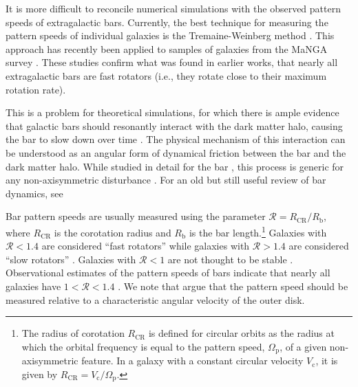 \documentclass[twocolumn,linenumbers]{aastex631}
\newcommand{\RCR}{\ensuremath{R_{\textrm{CR}}}}
\newcommand{\Rot}{\ensuremath{\mathcal{R}}}
\newcommand{\Vc}{\ensuremath{V_{\textrm{c}} }}
\newcommand{\PS}{\ensuremath{\Omega_{\textrm{p}}}}
\newcommand{\Rb}{\ensuremath{R_{\textrm{b}}}}
\begin{document}
It is more difficult to reconcile numerical simulations with the observed
pattern speeds of extragalactic bars. Currently, the best technique for
measuring the pattern speeds of individual galaxies is the Tremaine-Weinberg
method \citep{1984ApJ...282L...5T, 2011MSAIS..18...23C}. This approach has
recently been applied to samples of galaxies from the MaNGA survey
\citep{2019MNRAS.482.1733G, 2020MNRAS.491.3655G}. These studies confirm
what was found in earlier works, that nearly all extragalactic bars are fast
rotators (i.e., they rotate close to their maximum rotation rate).

This is a problem for theoretical simulations, for which there is ample evidence
that galactic bars should resonantly interact with the dark matter halo, causing
the bar to slow down over time \citep{1992ApJ...400...80H, 2000ApJ...543..704D,
2002MNRAS.330...35A, 2002ApJ...569L..83A, 2003MNRAS.341.1179A,
2003MNRAS.346..251O, 2005MNRAS.363..991H, 2006ApJ...637..214M,
2007MNRAS.375..460W, 2009ApJ...697..293D}. The physical mechanism of this
interaction can be understood as an angular form of dynamical friction between
the bar and the dark matter halo. While studied in detail for the bar
\citep{1984MNRAS.209..729T, 1985MNRAS.213..451W}, this process is generic for
any non-axisymmetric disturbance \citep{1972MNRAS.157....1L}. For an old but
still useful review of bar dynamics, see \citet{1993RPPh...56..173S}

Bar pattern speeds are usually measured using the parameter $\Rot=\RCR/\Rb$,
where \RCR{} is the corotation radius and \Rb{} is the bar length.\footnote{The
radius of corotation \RCR{} is defined for circular orbits as the radius at
which the orbital frequency is equal to the pattern speed, \PS{}, of a given
non-axisymmetric feature. In a galaxy with a constant circular velocity \Vc{},
it is given by $\RCR = \Vc / \PS$.} Galaxies with $\Rot < 1.4$ are considered
``fast rotators'' while galaxies with $\Rot > 1.4$ are considered ``slow
rotators'' \citep{2000ApJ...543..704D}. Galaxies with $\Rot < 1$ are not thought
to be stable \citep{1980AA....81..198C}. Observational estimates of the pattern
speeds of bars indicate that nearly all galaxies have $1 < \Rot < 1.4$
\citep{2011MSAIS..18...23C, 2015AA...576A.102A, 2019MNRAS.482.1733G,
2020MNRAS.491.3655G}. We note that \citet{2017ApJ...835..279F} argue that the
pattern speed should be measured relative to a characteristic angular velocity
of the outer disk.
\end{document}
